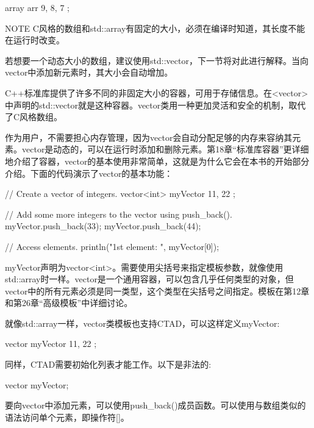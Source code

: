 \begin{cpp}
array arr { 9, 8, 7 };
\end{cpp}

\begin{myNotic}{NOTE}
C风格的数组和std::array有固定的大小，必须在编译时知道，其长度不能在运行时改变。
\end{myNotic}

若想要一个动态大小的数组，建议使用std::vector，下一节将对此进行解释。当向vector中添加新元素时，其大小会自动增加。


C++标准库提供了许多不同的非固定大小的容器，可用于存储信息。在<vector>中声明的std::vector就是这种容器。vector类用一种更加灵活和安全的机制，取代了C风格数组。

作为用户，不需要担心内存管理，因为vector会自动分配足够的内存来容纳其元素。vector是动态的，可以在运行时添加和删除元素。第18章“标准库容器”更详细地介绍了容器，vector的基本使用非常简单，这就是为什么它会在本书的开始部分介绍。下面的代码演示了vector的基本功能：


\begin{cpp}
// Create a vector of integers.
vector<int> myVector { 11, 22 };

// Add some more integers to the vector using push_back().
myVector.push_back(33);
myVector.push_back(44);

// Access elements.
println("1st element: {}", myVector[0]);
\end{cpp}

myVector声明为vector<int>。需要使用尖括号来指定模板参数，就像使用std::array时一样。vector是一个通用容器，可以包含几乎任何类型的对象，但vector中的所有元素必须是同一类型，这个类型在尖括号之间指定。模板在第12章和第26章“高级模板”中详细讨论。

就像std::array一样，vector类模板也支持CTAD，可以这样定义myVector:

\begin{cpp}
vector myVector { 11, 22 };
\end{cpp}

同样，CTAD需要初始化列表才能工作。以下是非法的:

\begin{cpp}
vector myVector;
\end{cpp}

要向vector中添加元素，可以使用push\_back()成员函数。可以使用与数组类似的语法访问单个元素，即操作符[]。


